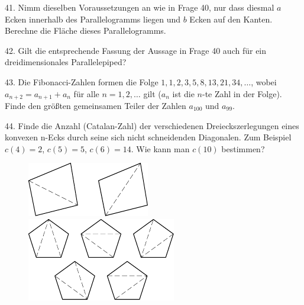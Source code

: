 \begin{problem}{41.}
	Nimm dieselben Voraussetzungen an wie in Frage 40, nur dass diesmal $a$ Ecken innerhalb des Parallelogramms liegen und $b$ Ecken auf den Kanten. Berechne die Fläche dieses Parallelogramms.
\end{problem}

\begin{problem}{42.}
	Gilt die entsprechende Fassung der Aussage in Frage 40 auch für ein dreidimensionales Parallelepiped?
\end{problem}

\begin{problem}{43.}
	Die Fibonacci-Zahlen formen die Folge $1,1,2,3,5,8,13,21,34,\allowbreak\dotsc$, wobei $a_{n+2}=a_{n+1}+a_n$ für alle
	$n=1,2,\dotsc$ gilt ($a_n$ ist die $n$-te Zahl in der Folge). Finde den größten gemeinsamen Teiler der Zahlen $a_{100}$ und $a_{99}$.
\end{problem}

\begin{problem}{44.}
	Finde die Anzahl (Catalan-Zahl) der verschiedenen Dreieckszerlegungen eines konvexen n-Ecks durch seine sich nicht schneidenden Diagonalen.
	Zum Beispiel $c(4)=2$, $c(5)=5$, $c(6)=14$. Wie kann man $c(10)$ bestimmen?
	\begin{figure}
		\includegraphics{resources/taskbook-281}
		\qquad
		\includegraphics{resources/taskbook-282}
	\end{figure}
\end{problem}

